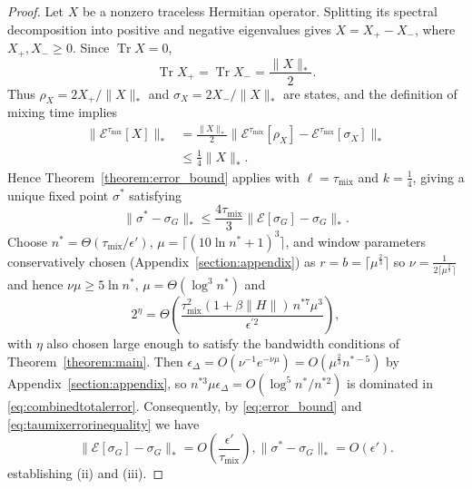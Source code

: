 \begin{proof}
Let $X$ be a nonzero traceless Hermitian operator. Splitting its spectral decomposition into positive and negative eigenvalues gives $X=X_+-X_-$, where $X_+,X_-\geq0$. Since $\operatorname{Tr}X=0$,
\begin{equation}
    \operatorname{Tr}X_+
    =\operatorname{Tr}X_-
    =\frac{\|X\|_*}{2}.
\end{equation}
Thus $\rho_X=2X_+/\|X\|_*$ and $\sigma_X=2X_-/\|X\|_*$ are states, and the definition of mixing time implies
\begin{equation}
\begin{aligned}
    \|\mathcal{E}^{\tau_{\mathrm{mix}}}[X]\|_*
    &=\frac{\|X\|_*}{2}
      \|\mathcal{E}^{\tau_{\mathrm{mix}}}[\rho_X]
       -\mathcal{E}^{\tau_{\mathrm{mix}}}[\sigma_X]\|_*\\
    &\leq \frac14\|X\|_*.
\end{aligned}
\label{eq:Xcontracting}
\end{equation}
Hence Theorem~\ref{theorem:error_bound} applies with $\ell=\tau_{\mathrm{mix}}$ and $k=\tfrac14$, giving a unique fixed point $\sigma^*$ satisfying
\begin{equation}
    \|\sigma^*-\sigma_G\|_*
    \leq \frac{4\tau_{\mathrm{mix}}}{3}
      \|\mathcal{E}[\sigma_G]-\sigma_G\|_*.
      \label{eq:taumixerrorinequality}
\end{equation}
Choose $n^*=\Theta(\tau_{\mathrm{mix}}/\epsilon')$, $\mu=\lceil(10\ln n^*+1)^3\rceil$, and window parameters conservatively chosen (Appendix~\ref{section:appendix}) as $r=b=\lceil\mu^{\frac{2}{3}}\rceil$ so $\nu = \frac{1}{2\lceil\mu^{\frac{2}{3}}\rceil}$ and hence $\nu\mu\geq 5\ln n^*$, $\mu=\Theta(\log^3 n^*)$ and
\begin{equation}
    2^\eta = \Theta\left(\frac{\tau_{\mathrm{mix}}^2(1+\beta\|H\|)\,
            n^{*7}\mu^3}{\epsilon^{\prime 2}}\right),
\end{equation}
with $\eta$ also chosen large enough to satisfy the bandwidth conditions of Theorem~\ref{theorem:main}. Then $\epsilon_\Delta=O(\nu^{-1}e^{-\nu\mu})=O(\mu^{\frac{2}{3}}n^{*-5})$ by Appendix~\ref{section:appendix}, so $n^{*3}\mu\epsilon_\Delta=O(\log^5 n^*/n^{*2})$ is dominated in \eqref{eq:combinedtotalerror}. Consequently, by \eqref{eq:error_bound} and \eqref{eq:taumixerrorinequality} we have
\begin{equation}
    \|\mathcal{E}[\sigma_G]-\sigma_G\|_* = O\left(\frac{\epsilon'}{\tau_{\mathrm{mix}}}\right),
    \|\sigma^*-\sigma_G\|_*= O\left(\epsilon'\right).
\end{equation}
establishing (ii) and (iii).


\end{proof}
